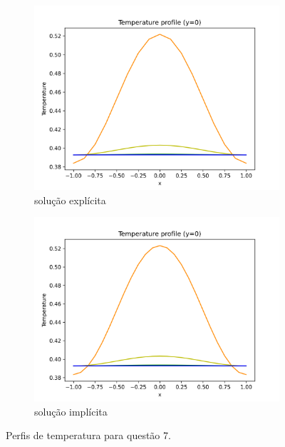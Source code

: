 \documentclass{article}
\begin{document}
\begin{figure}[h]
\centering
     \begin{subfigure}[b]{0.49\textwidth}
         \centering
         \includegraphics[width=\textwidth]{figs/q7a_temperature_profile.png}
         \caption{solução explícita}
	\label{fig:q7a_temperature_profile}
     \end{subfigure}
     \hfill
     \begin{subfigure}[b]{0.49\textwidth}
         \centering
     \includegraphics[width=\textwidth]{figs/q7b_temperature_profile.png}
         \caption{solução implícita}
	\label{fig:q7b_temperature_profile}
     \end{subfigure}
	\caption{Perfis de temperatura para questão 7.}
\end{figure}
\end{document}
